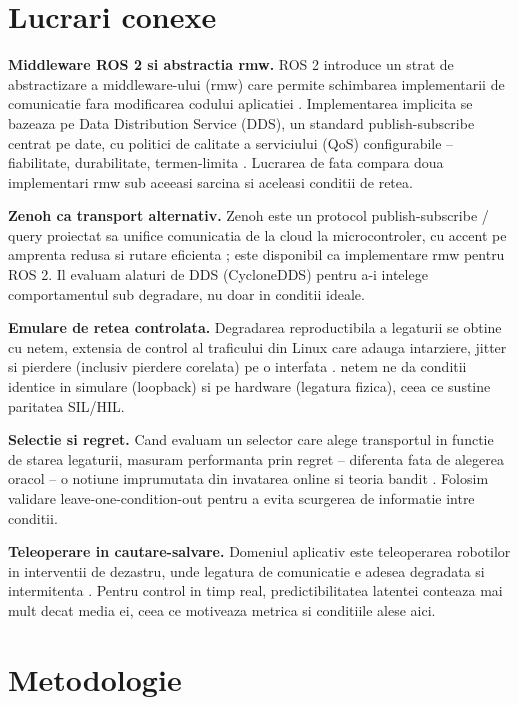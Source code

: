 \documentclass[11pt]{article}
\begin{document}
\section{Lucrari conexe}

\textbf{Middleware ROS 2 si abstractia rmw.} ROS 2 introduce un strat de abstractizare a
middleware-ului (rmw) care permite schimbarea implementarii de comunicatie fara modificarea
codului aplicatiei \cite{macenski2022ros2}. Implementarea implicita se bazeaza pe Data Distribution
Service (DDS), un standard publish-subscribe centrat pe date, cu politici de calitate a serviciului
(QoS) configurabile -- fiabilitate, durabilitate, termen-limita \cite{omg2015dds}. Lucrarea de fata
compara doua implementari rmw sub aceeasi sarcina si aceleasi conditii de retea.

\textbf{Zenoh ca transport alternativ.} Zenoh este un protocol publish-subscribe / query proiectat
sa unifice comunicatia de la cloud la microcontroler, cu accent pe amprenta redusa si rutare
eficienta \cite{corsaro2023zenoh}; este disponibil ca implementare rmw pentru ROS 2. Il evaluam
alaturi de DDS (CycloneDDS) pentru a-i intelege comportamentul sub degradare, nu doar in conditii
ideale.

\textbf{Emulare de retea controlata.} Degradarea reproductibila a legaturii se obtine cu netem,
extensia de control al traficului din Linux care adauga intarziere, jitter si pierdere (inclusiv
pierdere corelata) pe o interfata \cite{hemminger2005netem}. netem ne da conditii identice in
simulare (loopback) si pe hardware (legatura fizica), ceea ce sustine paritatea SIL/HIL.

\textbf{Selectie si regret.} Cand evaluam un selector care alege transportul in functie de starea
legaturii, masuram performanta prin regret -- diferenta fata de alegerea oracol -- o notiune
imprumutata din invatarea online si teoria bandit \cite{lattimore2020bandit}. Folosim validare
leave-one-condition-out pentru a evita scurgerea de informatie intre conditii.

\textbf{Teleoperare in cautare-salvare.} Domeniul aplicativ este teleoperarea robotilor in
interventii de dezastru, unde legatura de comunicatie e adesea degradata si intermitenta
\cite{murphy2014disaster}. Pentru control in timp real, predictibilitatea latentei conteaza mai
mult decat media ei, ceea ce motiveaza metrica si conditiile alese aici.

\section{Metodologie}
\end{document}

